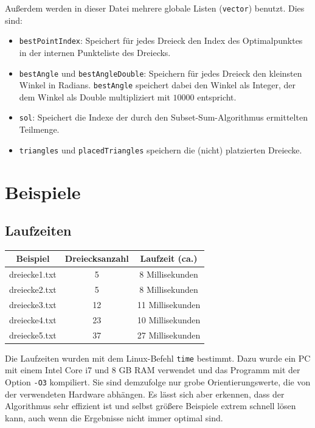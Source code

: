 \documentclass[a4paper, notitlepage, 12pt]{scrartcl}
\begin{document}
Außerdem werden in dieser Datei mehrere globale Listen (\texttt{vector}) benutzt. Dies sind:
\begin{itemize}
	\item \texttt{bestPointIndex}: Speichert für jedes Dreieck den Index des Optimalpunktes in der internen Punkteliste des Dreiecks.
	\item \texttt{bestAngle} und \texttt{bestAngleDouble}: Speichern für jedes Dreieck den kleinsten Winkel in Radians. \texttt{bestAngle} speichert dabei den Winkel als Integer, der dem Winkel als Double multipliziert mit $10000$ entspricht.
	\item \texttt{sol}: Speichert die Indexe der durch den Subset-Sum-Algorithmus ermittelten Teilmenge.
	\item \texttt{triangles} und \texttt{placedTriangles} speichern die (nicht) platzierten Dreiecke.
\end{itemize}
\section{Beispiele}
\subsection*{Laufzeiten}
\begin{table}[H]
	\begin{tabular}{|c|c|c|} 
		\hline
		Beispiel                                      & Dreiecksanzahl & Laufzeit (ca.)       \\ \hline \hline
		dreiecke1.txt                              & 5     & 8 Millisekunden    \\
		dreiecke2.txt                              & 5      & 8 Millisekunden     \\
		dreiecke3.txt                              & 12      & 11 Millisekunden     \\
		dreiecke4.txt                              & 23      & 10 Millisekunden    \\
		dreiecke5.txt                              & 37      & 27 Millisekunden    \\ \hline
	\end{tabular}
\end{table}
Die Laufzeiten wurden mit dem Linux-Befehl \texttt{time} bestimmt. Dazu wurde ein PC mit einem Intel Core i7 und 8 GB RAM verwendet und das Programm mit der Option \texttt{-O3} kompiliert. Sie sind demzufolge nur grobe Orientierungswerte, die von der verwendeten Hardware abhängen. Es lässt sich aber erkennen, dass der Algorithmus sehr effizient ist und selbst größere Beispiele extrem schnell lösen kann, auch wenn die Ergebnisse nicht immer optimal sind.
\end{document}
